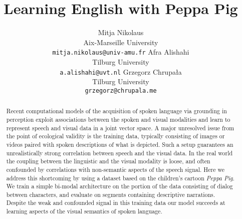 \documentclass[11pt,a4paper]{article}
\begin{document}
\title{Learning English with Peppa Pig}

\author{Mitja Nikolaus\\
  Aix-Marseille University\\
  \texttt{mitja.nikolaus@univ-amu.fr}
  \And
  Afra Alishahi\\
  Tilburg University\\
  \texttt{a.alishahi@uvt.nl}
  \AND
  Grzegorz Chrupała\\
  Tilburg University\\
  \texttt{grzegorz@chrupala.me}}

\date{}


\maketitle
\begin{abstract}
  Recent computational models of the acquisition of spoken language
  via grounding in perception exploit associations between the spoken
  and visual modalities and learn to represent speech and visual data
  in a joint vector space. A major unresolved issue from the point of
  ecological validity is the training data, typically consisting of
  images or videos paired with spoken descriptions of what is
  depicted. Such a setup guarantees an unrealistically strong
  correlation between speech and the visual data.  In the real world
  the coupling between the linguistic and the visual modality is
  loose, and often confounded by correlations with non-semantic
  aspects of the speech signal. Here we address this shortcoming by
  using a dataset based on the children's cartoon {\it Peppa Pig}.  We
  train a simple bi-modal architecture on the portion of the data
  consisting of dialog between characters, and evaluate on segments
  containing descriptive narrations. Despite the weak and confounded
  signal in this training data our model succeeds at learning aspects
  of the visual semantics of spoken language.
\end{abstract}










%
\end{document}
